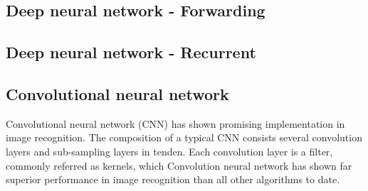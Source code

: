 \subsection{Deep neural network - Forwarding}
\subsection{Deep neural network - Recurrent}
\subsection{Convolutional neural network}
Convolutional neural network (CNN) has shown promising implementation in image recognition. The composition of a typical CNN consists several convolution layers and sub-sampling layers in tenden. Each convolution layer is a filter, commonly referred as kernels, which  
Convolution neural network has shown far superior performance in image recognition than all other algorithms to date.~\cite{Szegedy_2015}
